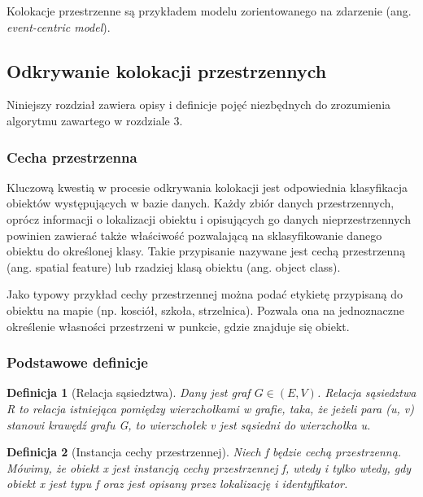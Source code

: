 \documentclass[12pt]{article}
\newtheorem{defin}{Definicja}
\newcounter{algorytm}
\begin{document}
Kolokacje przestrzenne są przykładem modelu zorientowanego na zdarzenie (ang. \textit{event-centric model}).

\subsection{Odkrywanie kolokacji przestrzennych}

Niniejszy rozdział zawiera opisy i definicje pojęć niezbędnych do zrozumienia algorytmu zawartego w rozdziale 3.

\subsubsection{Cecha przestrzenna}

Kluczową kwestią w procesie odkrywania kolokacji jest odpowiednia klasyfikacja obiektów występujących w bazie danych. Każdy zbiór danych przestrzennych, oprócz informacji o lokalizacji obiektu i opisujących go danych nieprzestrzennych powinien zawierać także właściwość pozwalającą na sklasyfikowanie danego obiektu do określonej klasy. Takie przypisanie nazywane jest cechą przestrzenną (ang. spatial feature) lub rzadziej klasą obiektu (ang. object class).

Jako typowy przykład cechy przestrzennej można podać etykietę przypisaną do obiektu na mapie (np. kosciół, szkoła, strzelnica). Pozwala ona na jednoznaczne określenie własności przestrzeni w punkcie, gdzie znajduje się obiekt.

\subsubsection{Podstawowe definicje}

\begin{defin}[Relacja sąsiedztwa]
Dany jest graf $ G \in (E, V) $. Relacja sąsiedztwa R to relacja istniejąca pomiędzy wierzchołkami w grafie, taka, że jeżeli para (u, v) stanowi krawędź grafu G, to wierzchołek v jest sąsiedni do wierzchołka u. 
\end{defin}

\begin{defin}[Instancja cechy przestrzennej]
Niech f będzie cechą przestrzenną. Mówimy, że obiekt x jest instancją cechy przestrzennej f, wtedy i tylko wtedy, gdy obiekt x jest typu f oraz jest opisany przez lokalizację i identyfikator.
\end{defin}
\end{document}

